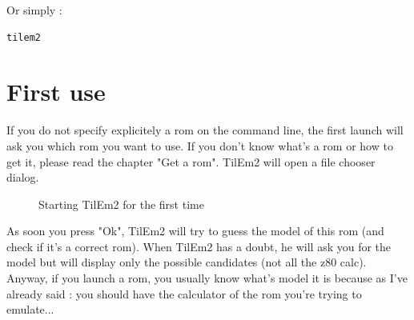 \documentclass[10pt]{report}
\begin{document}
Or simply :\newline
\begin{lstlisting}
tilem2
\end{lstlisting}

\section{First use}
If you do not specify explicitely a rom on the command line, the first launch will ask you which rom you want to use.\newline
If you don't know what's a rom or how to get it, please read the chapter "Get a rom".\newline
TilEm2 will open a file chooser dialog.\newline

\begin{figure}[H]
\centering
{}
\caption{Starting TilEm2 for the first time}
\end{figure}

As soon you press "Ok", TilEm2 will try to guess the model of this rom (and check if it's a correct rom).\newline
When TilEm2 has a doubt, he will ask you for the model but will display only the possible candidates (not all the z80 calc).\newline
Anyway, if you launch a rom, you usually know what's model it is because as I've already said : you should have the calculator of the rom you're trying to emulate...\newline
\end{document}
